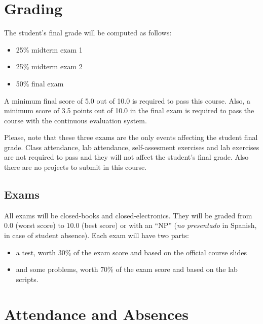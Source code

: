 \documentclass[11pt, a4paper, twoside]{article}
\begin{document}
\section{Grading}

The student's final grade will be computed as follows:

\begin{itemize}

  \item 25\% midterm exam 1

  \item 25\% midterm exam 2

  \item 50\% final exam

\end{itemize}

A minimum final score of 5.0 out of 10.0 is required to pass this course. Also,
a minimum score of 3.5 points out of 10.0 in the final exam is required to pass
the course with the continuous evaluation system.

Please, note that these three exams are the only events affecting the student
final grade. Class attendance, lab attendance, self-assesment exercises and lab
exercises are not required to pass and they will not affect the student's final
grade. Also there are no projects to submit in this course.

\subsection{Exams}

All exams will be closed-books and closed-electronics. They will be graded from
$0.0$ (worst score) to $10.0$ (best score) or with an ``NP'' (\emph{no
presentado} in Spanish, in case of student absence). Each exam will have two
parts:

\begin{itemize}

  \item a test, worth 30\% of the exam score and based on the official course
    slides

  \item and some problems, worth 70\% of the exam score and based on the lab
    scripts.

\end{itemize}

\section{Attendance and Absences}
\end{document}
